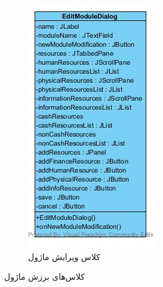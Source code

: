 \begin{figure}[H]
\begin{subfigure}[b]{0.3\textwidth}
	\includegraphics[width=\textwidth]{img/class-design/ui/EditModuleDialog.jpg}
	\caption{کلاس ویرایش ماژول}
	\end{subfigure}
	\caption{کلاس‌های برزش ماژول}
\end{figure}

